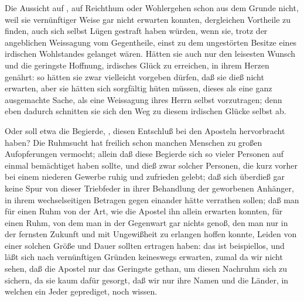 \begin{aufza}
\begin{aufzb}
\begin{aufzc}
\item Die Aussicht auf , auf Reichthum oder Wohlergehen schon aus dem Grunde nicht, weil sie vernünftiger Weise gar nicht erwarten konnten, dergleichen Vortheile zu finden, auch sich selbst Lügen gestraft haben würden, wenn sie, trotz der angeblichen Weissagung vom Gegentheile, einst zu dem ungestörten Besitze eines irdischen Wohlstandes gelanget wären. Hätten sie auch nur den leisesten Wunsch und die geringste Hoffnung, irdisches Glück zu erreichen, in ihrem Herzen genährt: so hätten sie zwar vielleicht vorgeben dürfen, daß sie dieß nicht erwarten, aber sie hätten sich sorgfältig hüten müssen, dieses als eine ganz ausgemachte Sache, als eine Weissagung ihres Herrn selbst vorzutragen; denn eben dadurch schnitten sie sich den Weg zu diesem irdischen Glücke selbst ab.
\item Oder soll etwa die Begierde, , diesen Entschluß bei den Aposteln hervorbracht haben? Die Ruhmsucht hat freilich schon manchen Menschen zu großen Aufopferungen vermocht; allein daß diese Begierde sich so vieler Personen auf einmal bemächtiget haben sollte, und dieß zwar solcher Personen, die kurz vorher bei einem niederen Gewerbe ruhig und zufrieden gelebt; daß sich überdieß gar keine Spur von dieser Triebfeder in ihrer Behandlung der geworbenen Anhänger, in ihrem wechselseitigen Betragen gegen einander hätte verrathen sollen; daß man für einen Ruhm von der Art, wie die Apostel ihn allein erwarten konnten, für einen Ruhm, von dem man in der Gegenwart gar nichts genoß, den man nur in der fernsten Zukunft und mit Ungewißheit zu erlangen hoffen konnte, Leiden von einer solchen Größe und Dauer sollten ertragen haben: das ist beispiellos, und läßt sich nach vernünftigen Gründen keineswegs erwarten, zumal da wir nicht sehen, daß die Apostel nur das Geringste gethan, um diesen Nachruhm sich zu sichern, da sie kaum dafür gesorgt, daß wir nur ihre Namen und die Länder, in welchen ein Jeder geprediget, noch wissen.

\end{aufzc}
\end{aufzb}
\end{aufza}
